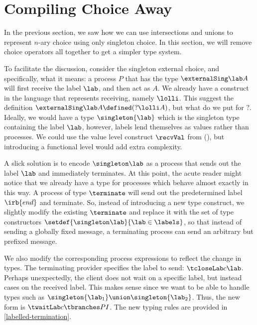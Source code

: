 
\section{Compiling Choice Away}

In the previous section, we saw how we can use intersections and unions to represent $n$-ary choice using only singleton choice. In this section, we will remove choice operators all together to get a simpler type system.

To facilitate the discussion, consider the singleton external choice, and specifically, what it means: a process $P$ that has the type $\externalSing \lab A$ will first receive the label $\lab$, and then act as $A$. We already have a construct in the language that represents receiving, namely $\lolli$. This suggest the definition $\externalSing \lab A \defined (? \lolli A)$, but what do we put for $?$. Ideally, we would have a type $\singleton{\lab}$ which is the singleton type containing
the label $\lab$, however, labels lend themselves as values rather than processes. We could use the value level construct $\recvVal$ from (), but introducing a functional level would add extra complexity.

A slick  solution is to encode $\singleton \lab$ as a process that sends out the label $\lab$ and immediately terminates. At this point, the acute reader might notice that we already have a type for processes which behave almost exactly in this way. A process of type $\terminate$ will send out the predetermined label $\irb{end}$ and terminate. So, instead of introducing a new type construct, we
slightly modify the existing $\terminate$ and replace it with the set of type constructors $\setdef{\singleton \lab}{\lab \in \labels}$, so that instead of sending a globally fixed message, a terminating process can send an arbitrary but prefixed message.

We also modify the corresponding process expressions to reflect the change in types. The terminating provider specifies the label to send: $\tcloseLab c \lab$. Perhaps unexpectedly, the client does not wait on a specific label, but instead cases on the received label. This makes sense since we want to be able to handle types such as $\singleton{\lab_1} \union \singleton{\lab_2}$. Thus, the new form is $\twaitLab c {\tbranches P I}$. The new typing rules are provided in \cref{labelled-termination}.



